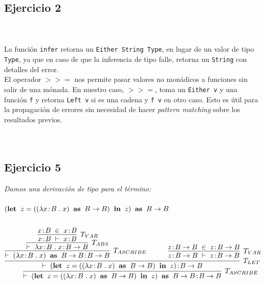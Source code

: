 \documentclass[a4paper,10pt]{article}
\begin{document}
\subsection*{Ejercicio 2} 
	\emph{}
	\\
	\\
	La función \texttt{infer} retorna un \texttt{Either String Type}, en lugar de un valor de tipo \texttt{Type}, ya que en caso de que la inferencia de tipo falle, retorna un \texttt{String} con detalles del error.
	\\
	El operador $>>=$ nos permite pasar valores no monádicos a funciones sin salir de una mónada. En nuestro caso, $>>=$, toma un \texttt{Either v} y una función \texttt{f} y retorna \texttt{Left v} si es una cadena y \texttt{f v} en otro caso. Esto es útil para la propagación de errores sin necesidad de hacer \emph{pattern matching} sobre los resultados previos.
	\\
	\\
	\\
\subsection*{Ejercicio 5} 
	\emph{Damos una derivación de tipo para el término:
		\\
		\\ 
		\indent $({\bf let}\;\;z=((\lambda x\!:\!B\;.\;x)\;\;{\bf as}\;\;B \rightarrow B)\;\;{\bf in}\;\;z)\;\;{\bf as}\;\;B \rightarrow B$
	}
	\\
	\\
	\begin{align*}
		\infer[T_{ASCRIBE}]{
			\vdash \; ({\bf let}\;\;z=((\lambda x\!:\!B\;.\;x)\;\;{\bf as}\;\;B \rightarrow B)\;\;{\bf in}\;\;z)\;\;{\bf as}\;\;B \rightarrow B\!:\!B \rightarrow B
		}{
			\infer[T_{LET}]
			{
				\vdash \; ({\bf let}\;\;z=((\lambda x\!:\!B\;.\;x)\;\;{\bf as}\;\;B \rightarrow B)\;\;{\bf in}\;\;z)\!:\!B \rightarrow B
			}{
				\infer[T_{ASCRIBE}]
				{
					\vdash \; (\lambda x\!:\!B\;.\;x)\;\;{\bf as}\;\;B \rightarrow B\!:\!B \rightarrow B
				}
				{
					\infer[T_{ABS}]
					{
						\vdash \; \lambda x\!:\!B\;.\;x\!:\!B \rightarrow B
					}
					{
						\infer[T_{VAR}]
						{
							x\!:\!B \; \vdash \; x\!:\!B
						}
						{
							x\!:\!B \; \in \; x\!:\!B
						}
					}
				} & \qquad
				\infer[T_{VAR}]
				{
					z\!:\!B \rightarrow B\; \vdash \;z\!:\!B \rightarrow B
				}
				{
					z\!:\!B \rightarrow B\; \in \;z\!:\!B \rightarrow B
				}
			}
		}
	\end{align*}
	\\
	\\
	\\
\end{document}
